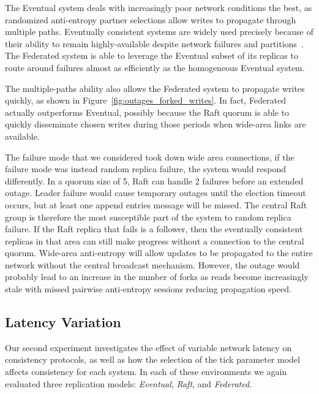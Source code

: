 \documentclass[10pt,conference,letterpaper]{IEEEtran}
\begin{document}
The Eventual system deals with increasingly poor network conditions the best,
as randomized anti-entropy partner selections allow writes to propagate through multiple
paths.
Eventually consistent systems are widely used precisely because of their ability to remain
highly-available despite network failures and
partitions~\cite{bailis_bolt-causal_2013,bailis_probabilistically_2012,bailis_quantifying_2014}.
The Federated system is able to leverage the Eventual subset of its replicas to route
around failures almost as efficiently as the homogeneous Eventual system.

The multiple-paths ability also allows the Federated system to propagate writes quickly,
as shown in Figure~\ref{fig:outages_forked_writes}. In fact, Federated actually outperforms 
Eventual, possibly because the Raft quorum is able to quickly disseminate chosen
writes during those periods when wide-area links are available.

The failure mode that we considered took down wide area connections, if
the failure mode was instead random replica failure, the system would respond
differently.
In a quorum size of 5, Raft can handle 2 failures before an extended outage.
Leader failure would cause temporary outages until the election timeout
occurs, but at least one append entries message will be missed.
The central Raft group is therefore the most susceptible part of the system to
random replica failure.
If the Raft replica that fails is a follower, then the eventually consistent
replicas in that area can still make progress without a connection to the
central quorum.
Wide-area anti-entropy will allow updates to be propagated to the entire
network without the central broadcast mechanism.
However, the outage would probably lead to an increase in the number of forks
as reads become increasingly stale with missed pairwise anti-entropy sessions
reducing propagation speed.


\subsection{Latency Variation}


Our second experiment investigates the effect of variable network latency on
consistency protocols, as well as how the selection of the tick parameter
model affects consistency for each system.
In each of these environments we again evaluated three replication models:
\textit{Eventual}, \textit{Raft}, and \textit{Federated}.
\end{document}
